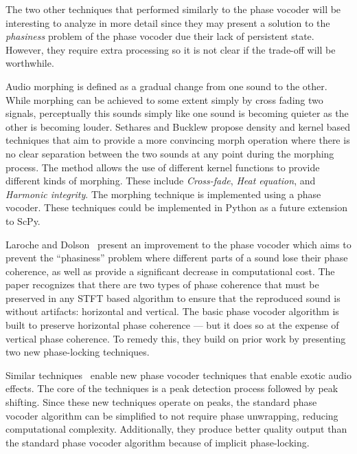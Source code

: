 \documentclass{article}
\begin{document}
The two other techniques that performed similarly to the phase vocoder will be interesting to
analyze in more detail since they may present a solution to the \textit{phasiness} problem of the
phase vocoder due their lack of persistent state. However, they require extra processing so it is
not clear if the trade-off will be worthwhile.
\\\par
Audio morphing is defined as a gradual change from one sound to the other. While morphing can be
achieved to some extent simply by cross fading two signals, perceptually this sounds simply like
one sound is becoming quieter as the other is becoming louder. Sethares and Bucklew
\cite{sethares2012kernel} propose density and kernel based techniques that aim to provide a more
convincing morph operation where there is no clear separation between the two sounds at any point
during the morphing process. The method allows the use of different kernel functions to provide
different kinds of morphing. These include \textit{Cross-fade}, \textit{Heat equation}, and
\textit{Harmonic integrity}. The morphing technique is implemented using a phase vocoder. These
techniques could be implemented in Python as a future extension to ScPy.
\\\par
Laroche and Dolson~\cite{laroche1999improved} present an improvement to the phase vocoder which
aims to prevent the ``phasiness'' problem where different parts of a sound lose their phase
coherence, as well as provide a significant decrease in computational cost. The paper recognizes
that there are two types of phase coherence that must be preserved in any STFT based algorithm to
ensure that the reproduced sound is without artifacts: horizontal and vertical. The basic phase
vocoder algorithm is built to preserve horizontal phase coherence --- but it does so at the expense
of vertical phase coherence. To remedy this, they build on prior work by presenting two new
phase-locking techniques.

Similar techniques~\cite{laroche1999new} enable new phase vocoder techniques that enable
exotic audio effects. The core of the techniques is a peak detection process followed by peak
shifting. Since these new techniques operate on peaks, the standard phase vocoder algorithm can be
simplified to not require phase unwrapping, reducing computational complexity. Additionally, they
produce better quality output than the standard phase vocoder algorithm because of implicit
phase-locking.
\end{document}
